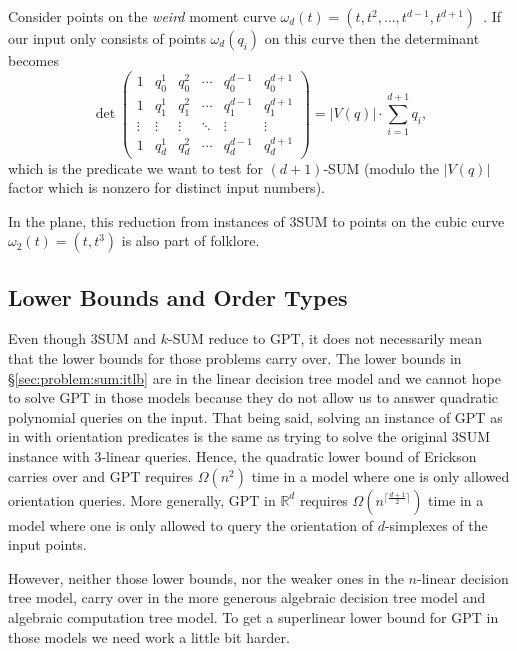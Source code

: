 Consider points on the \emph{weird} moment curve $\omega_d(t) = (t, t^2, \ldots,
t^{d-1}, t^{d+1})$~\cite{Er99b}.
If our input only consists of points $\omega_d(q_i)$ on this curve then the
determinant becomes
%
\begin{displaymath}
\det\begin{pmatrix}
1      & q_0^1 & q_0^2 & \cdots & q_0^{d-1} & q_0^{d+1} \\
1      & q_1^1 & q_1^2 & \cdots & q_1^{d-1} & q_1^{d+1} \\
\vdots & \vdots  & \vdots  & \ddots & \vdots & \vdots  \\
1      & q_d^1 & q_d^2 & \cdots & q_d^{d-1} & q_d^{d+1}
\end{pmatrix} = |V(q)| \cdot \sum_{i=1}^{d+1} q_i,
\end{displaymath}
%
which is the predicate we want to test for $(d+1)$-SUM (modulo the $|V(q)|$
factor which is nonzero for distinct input numbers).

In the plane, this reduction from instances of 3SUM to points on
the cubic curve \(\omega_2(t) = (t, t^3)\) is also part of folklore.

\subsection{Lower Bounds and Order Types}

Even though 3SUM and \(k\)-SUM reduce to GPT, it does not necessarily mean that
the lower bounds for those problems carry over.
%
The lower bounds in
\S\ref{sec:problem:sum:itlb} are in the linear decision tree model and we
cannot hope to solve GPT in those models because they do not allow us to answer
quadratic polynomial queries on the input.
%
That being said, solving an instance of GPT as in  with
orientation predicates is the same as trying to solve the original 3SUM
instance with \(3\)-linear queries. Hence, the quadratic lower bound of
Erickson~\cite{Er99a} carries over and GPT requires \(\Omega(n^2)\) time in a
model where one is only allowed orientation queries. More generally, GPT in
\(\mathbb{R}^d\) requires \(\Omega(n^{\lceil \frac{d+1}{2} \rceil})\) time in a
model where one is only allowed to query the orientation of \(d\)-simplexes of
the input points.

However, neither those lower bounds, nor the weaker ones in the \(n\)-linear
decision tree model, carry over in the more generous algebraic decision
tree model and algebraic computation tree model.
%
To get a superlinear lower bound for GPT in those models we need work a little
bit harder.

